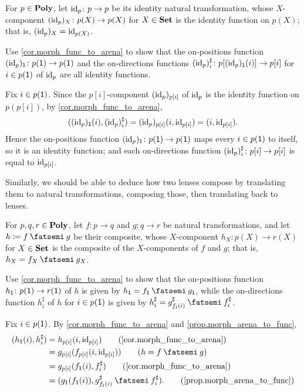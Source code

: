 \documentclass[Book-Poly]{subfiles}
\begin{document}
\begin{exercise} \label{exc.arena_morph_id}
For $p\in\mathbf{Poly}$, let $\mathrm{id}_p \colon p \to p$ be its identity natural transformation, whose $X$-component $(\mathrm{id}_p)_X\colon p(X)\to p(X)$ for $X\in\mathbf{Set}$ is the identity function on $p(X)$; that is, $(\mathrm{id}_p)_X=\mathrm{id}_{p(X)}$.

Use \cref{cor.morph_func_to_arena} to show that the on-positions function $(\mathrm{id}_p)_{\textsf{1}}\colon p(\textsf{1})\to p(\textsf{1})$ and the on-directions functions $(\mathrm{id}_p)^\sharp_i\colon p[(\mathrm{id}_p)_{\textsf{1}}(i)]\to p[i]$ for $i\in p(\textsf{1})$ of $\mathrm{id}_p$ are all identity functions.
\begin{solution}
Fix $i\in p(\textsf{1})$.
Since the $p[i]$-component $(\mathrm{id}_p)_{p[i]}$ of $\mathrm{id}_p$ is the identity function on $p(p[i])$, by \cref{cor.morph_func_to_arena},
\[
    ((\mathrm{id}_p)_{\textsf{1}}(i), (\mathrm{id}_p)^\sharp_i) = (\mathrm{id}_p)_{p[i]}(i,\mathrm{id}_{p[i]}) = (i,\mathrm{id}_{p[i]}).
\]
Hence the on-positions function $(\mathrm{id}_p)_{\textsf{1}}\colon p(\textsf{1})\to p(\textsf{1})$ maps every $i\in p(\textsf{1})$ to itself, so it is an identity function; and each on-directions function $(\mathrm{id}_p)^\sharp_i\colon p[i]\to p[i]$ is equal to $\mathrm{id}_{p[i]}$.
\end{solution}
\end{exercise}

Similarly, we should be able to deduce how two lenses compose by translating them to natural transformations, composing those, then translating back to lenses.

\begin{exercise} \label{exc.arena_morph_comp}
For $p,q,r\in\mathbf{Poly}$, let $f\colon p\to q$ and $g\colon q\to r$ be natural transformations, and let $h\coloneqq f\then g$ be their composite, whose $X$-component $h_X\colon p(X)\to r(X)$ for $X\in\mathbf{Set}$ is the composite of the $X$-components of $f$ and $g$; that is, $h_X=f_X\then g_X$.

Use \cref{cor.morph_func_to_arena} to show that the on-positions function $h_{\textsf{1}}\colon p(\textsf{1})\to r(\textsf{1})$ of $h$ is given by $h_\1=f_\1\then g_\1$, while the on-directions function $h^\sharp_i$ of $h$ for $i\in p(\textsf{1})$ is given by $h^\sharp_i=g^\sharp_{f_\1(i)}\then f^\sharp_i$.
\begin{solution}
Fix $i\in p(\textsf{1})$.
By \cref{cor.morph_func_to_arena} and \cref{prop.morph_arena_to_func},
\begin{align*}
    (h_\1(i), h^\sharp_i) &= h_{p[i]}(i, \id_{p[i]}) \tag{\cref{cor.morph_func_to_arena}} \\
    &= g_{p[i]}(f_{p[i]}(i, \id_{p[i]})) \tag{$h = f \then g$} \\
    &= g_{p[i]}(f_\1(i), f^\sharp_i) \tag{\cref{cor.morph_func_to_arena}} \\
    &= (g_\1(f_\1(i)), g^\sharp_{f_\1(i)} \then f^\sharp_i). \tag{\cref{prop.morph_arena_to_func}}
\end{align*}
\end{solution}
\end{exercise}
\end{document}
